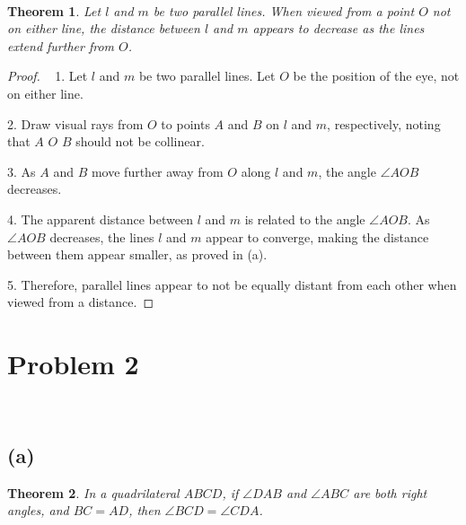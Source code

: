 \documentclass{article}
\newtheorem{theorem}{Theorem}
\begin{document}
~

\begin{theorem}
Let \( l \) and \( m \) be two parallel lines. When viewed from a point \( O \) not on either line, the distance between \( l \) and \( m \) appears to decrease as the lines extend further from \( O \).
\end{theorem}

\begin{proof}

~
1. Let \( l \) and \( m \) be two parallel lines. Let \( O \) be the position of the eye, not on either line.

2. Draw visual rays from \( O \) to points \( A \) and \( B \) on \( l \) and \( m \), respectively, noting that \(A\) \(O\) \(B\) should not be collinear.

3. As \( A \) and \( B \) move further away from \( O \) along \( l \) and \( m \), the angle \( \angle AOB \) decreases.

4. The apparent distance between \( l \) and \( m \) is related to the angle \( \angle AOB \). As \( \angle AOB \) decreases, the lines \( l \) and \( m \) appear to converge, making the distance between them appear smaller, as proved in (a).

5. Therefore, parallel lines appear to not be equally distant from each other when viewed from a distance.
\end{proof}

\newpage

\section*{Problem 2}

~

\subsection*{(a)}

\begin{theorem}
In a quadrilateral \( ABCD \), if \( \angle DAB \) and \( \angle ABC \) are both right angles, and \( BC = AD \), then \( \angle BCD = \angle CDA \).
\end{theorem}
\end{document}
